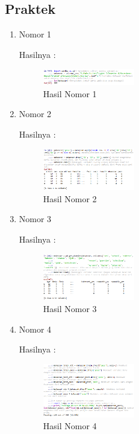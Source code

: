 \subsection{Praktek}
\begin{enumerate}
\item Nomor 1
\hfill\break
	
Hasilnya :
\begin{figure}[H]
		\includegraphics[width=4cm]{figures/1174054/2/1.png}
		\centering
		\caption{Hasil Nomor 1}
\end{figure}

\item Nomor 2
\hfill\break
	
Hasilnya :
\begin{figure}[H]
		\includegraphics[width=4cm]{figures/1174054/2/2.png}
		\centering
		\caption{Hasil Nomor 2}
\end{figure}

\item Nomor 3
\hfill\break
	
Hasilnya :
\begin{figure}[H]
		\includegraphics[width=4cm]{figures/1174054/2/3.png}
		\centering
		\caption{Hasil Nomor 3}
\end{figure}

\item Nomor 4
\hfill\break
	
Hasilnya :
\begin{figure}[H]
		\includegraphics[width=4cm]{figures/1174054/2/4.png}
		\centering
		\caption{Hasil Nomor 4}
\end{figure}


\end{enumerate}
